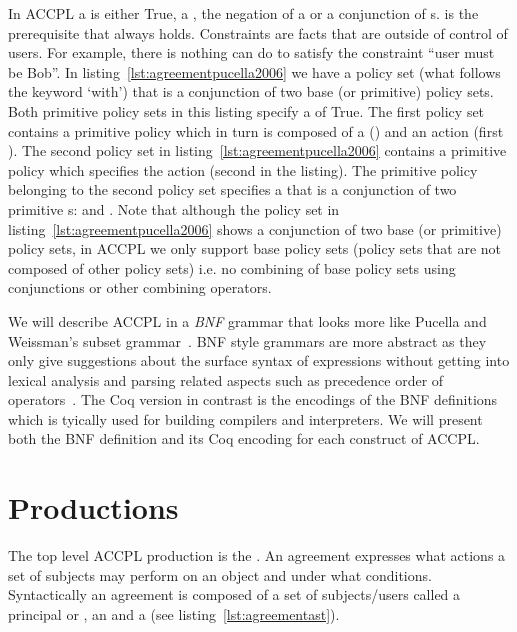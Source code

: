 In \ac{ACCPL} a  is either True, a , the negation of a  or a conjunction of s.  is the prerequisite that always holds. Constraints are facts that are outside of control of users. For example, there is nothing  can do to satisfy the constraint ``user must be Bob''. In listing~\ref{lst:agreementpucella2006} we have a policy set (what follows the keyword `with') that is a conjunction of two base (or primitive) policy sets. Both primitive policy sets in this listing specify a  of True. The first policy set contains a primitive policy which in turn is composed of a  () and an action (first ). The second policy set in listing~\ref{lst:agreementpucella2006} contains a primitive policy which specifies the action  (second  in the listing). The primitive policy belonging to the second policy set specifies a  that is a conjunction of two primitive s:  and . Note that although the policy set in listing~\ref{lst:agreementpucella2006} shows a conjunction of two base (or primitive) policy sets, in \ac{ACCPL} we only support base policy sets (policy sets that are not composed of other policy sets) i.e. no combining of base policy sets using conjunctions or other combining operators. 


We will describe \ac{ACCPL} in a \emph{BNF} grammar that looks more like Pucella and Weissman's subset grammar~\cite{pucella2006}. BNF style grammars are more abstract as they only give suggestions about the surface syntax of expressions without getting into lexical analysis and parsing related aspects such as precedence order of operators~\cite{piercesf2011}. The Coq version in contrast is the encodings of the BNF definitions which is tyically used for building compilers and interpreters. We will present both the BNF definition and its Coq encoding for each construct of \ac{ACCPL}. 


\section{Productions} \label{sec:productionast}

The top level \ac{ACCPL} production is the . An agreement expresses what actions a set of subjects may perform on an object and under what conditions. Syntactically an agreement is composed of a set of subjects/users called a principal or , an  and a  (see listing~\ref{lst:agreementast}).

